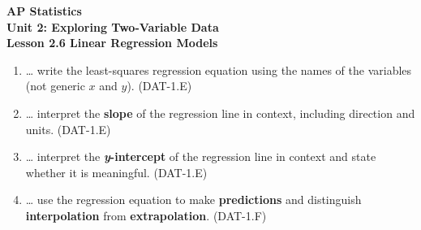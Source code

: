 \documentclass[10pt]{article}
\begin{document}
\vspace{-0.8in}

\begin{center}
  {\color{white}\textbf{\LARGE AP Statistics}}\\[4pt]
  {\color{skymid}\large\textbf{Unit 2: Exploring Two-Variable Data}}\\[6pt]
  {\color{white}\textbf{\large Lesson 2.6 \quad Linear Regression Models}}
\end{center}

\vspace{0.22in}
\namedateperiod
\vspace{0.18in}

\begin{learningtargetbox}
\small
\begin{enumerate}[leftmargin=1.5em, itemsep=5pt]
  \item \ldots{} write the least-squares regression equation using the names of the variables
        (not generic $x$ and $y$). \hfill\textcolor{slate}{\small(DAT-1.E)}
  \item \ldots{} interpret the \textbf{slope} of the regression line in context, including
        direction and units. \hfill\textcolor{slate}{\small(DAT-1.E)}
  \item \ldots{} interpret the \textbf{\textit{y}-intercept} of the regression line in context
        and state whether it is meaningful. \hfill\textcolor{slate}{\small(DAT-1.E)}
  \item \ldots{} use the regression equation to make \textbf{predictions} and distinguish
        \textbf{interpolation} from \textbf{extrapolation}. \hfill\textcolor{slate}{\small(DAT-1.F)}
\end{enumerate}
\end{learningtargetbox}

\vspace{0.14in}
\end{document}
